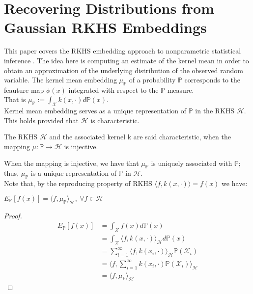 \section{Recovering Distributions from Gaussian RKHS Embeddings}
This paper covers the RKHS embedding approach to nonparametric statistical inference \cite{pmlr}.
The idea here is computing an estimate of the kernel mean in order to obtain an approximation of the underlying distribution of the observed random variable.
The kernel mean embedding $\mu_{\mathbb{P}}$ of a probability $\mathbb{P}$ corresponds to the feauture map $\phi(x)$ integrated with respect to the $\mathbb{P}$ measure.
\\
That is $\mu_{\mathbb{P}}:=\int_{\mathcal{X}}k(x,\cdot)d\mathbb{P}(x)$.
\\
Kernel mean embedding serves as a unique representation of $\mathbb{P}$ in the RKHS $\mathcal{H}$. This holds provided  that $\mathcal{H}$ is characteristic. 
\begin{definition}
The RKHS $\mathcal{H}$ and the associated kernel k are said characteristic, when the mapping $\mu : \mathbb{P} \rightarrow \mathcal{H}$ is injective.
\end{definition}
When the mapping is injective, we have that $\mu_{\mathbb{P}}$ is uniquely associated with $\mathbb{P}$; thus, $\mu_{\mathbb{P}}$ is a unique representation of $\mathbb{P}$ in $\mathcal{H}$. 
\\
Note that, by the reproducing property of RKHS $\langle f, k(x,\cdot) \rangle=f(x)$ we have:
\\
\begin{center}
    $E_{\mathbb{P}}[f(x)]=\langle f,\mu_{\mathbb{P}} \rangle_{\mathcal{H}}, \ \forall f \in \mathcal{H}$
\end{center}

\begin{proof}   
\begin{align*}
E_{\mathbb{P}}[f(x)]&=\int_{\mathcal{X}} f(x) d\mathbb{P}(x)\\
&=\int_{\mathcal{X}} \langle f, k(x,\cdot) \rangle_{\mathcal{H}} d\mathbb{P}(x)\\
&= \sum_{i=1}^{\infty} \langle f, k(x_{i}, \cdot) \rangle_{\mathcal{H}} \mathbb{P}(\mathcal{X}_{i}) \\
&=\langle f, \sum_{i=1}^{\infty} k(x_{i}, \cdot)\mathbb{P}(\mathcal{X}_{i}) \rangle_{\mathcal{H}}\\
&=\langle f, \mu_{\mathbb{P}} \rangle_{\mathcal{H}}
\end{align*}
\end{proof}

